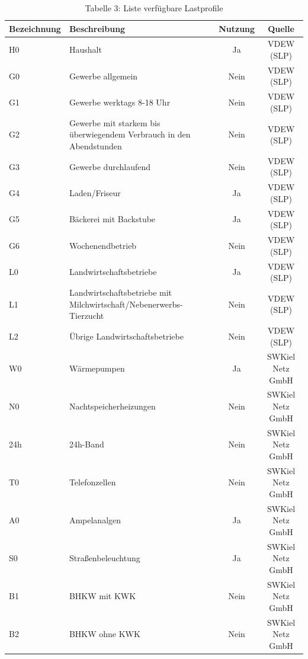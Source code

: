 \begin{table}[htbp]
    \centering
    \caption{Tabelle 3: Liste verfügbare Lastprofile}
    \label{tab:lastprofile}
    \begin{tabular}{llcc}
        \toprule
        \textbf{Bezeichnung} & \textbf{Beschreibung} & \textbf{Nutzung} & \textbf{Quelle} \\
        \midrule
        H0 & Haushalt & Ja & VDEW (SLP) \\
        G0 & Gewerbe allgemein & Nein & VDEW (SLP) \\
        G1 & Gewerbe werktags 8-18 Uhr & Nein & VDEW (SLP) \\
        G2 & Gewerbe mit starkem bis überwiegendem Verbrauch in den Abendstunden & Nein & VDEW (SLP) \\
        G3 & Gewerbe durchlaufend & Nein & VDEW (SLP) \\
        G4 & Laden/Friseur & Ja & VDEW (SLP) \\
        G5 & Bäckerei mit Backstube & Ja & VDEW (SLP) \\
        G6 & Wochenendbetrieb & Nein & VDEW (SLP) \\
        L0 & Landwirtschaftsbetriebe & Ja & VDEW (SLP) \\
        L1 & Landwirtschaftsbetriebe mit Milchwirtschaft/Nebenerwerbs-Tierzucht & Nein & VDEW (SLP) \\
        L2 & Übrige Landwirtschaftsbetriebe & Nein & VDEW (SLP) \\
        W0 & Wärmepumpen & Ja & SWKiel Netz GmbH \\
        N0 & Nachtspeicherheizungen & Nein & SWKiel Netz GmbH \\
        24h & 24h-Band & Nein & SWKiel Netz GmbH \\
        T0 & Telefonzellen & Nein & SWKiel Netz GmbH \\
        A0 & Ampelanalgen & Ja & SWKiel Netz GmbH \\
        S0 & Straßenbeleuchtung & Ja & SWKiel Netz GmbH \\
        B1 & BHKW mit KWK & Nein & SWKiel Netz GmbH \\
        B2 & BHKW ohne KWK & Nein & SWKiel Netz GmbH \\
        \bottomrule
    \end{tabular}
\end{table}

